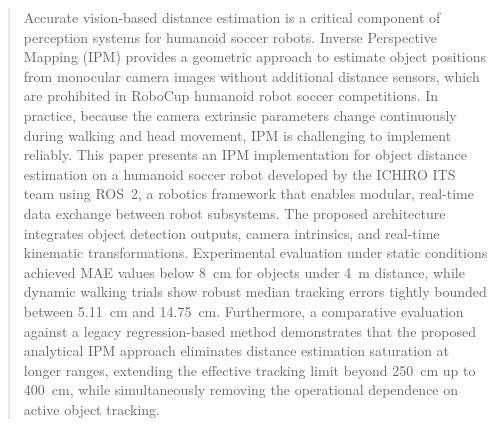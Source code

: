 \documentclass[journal]{IAENGtran}
\begin{document}







\maketitle

\pagestyle{empty}
\thispagestyle{empty}

\begin{abstract}
Accurate vision-based distance estimation is a critical component of
perception systems for humanoid soccer robots. Inverse Perspective Mapping
(IPM) provides a geometric approach to estimate object positions from
monocular camera images without additional distance sensors, which are prohibited
in RoboCup humanoid robot soccer competitions. In practice, because the camera extrinsic
parameters change continuously during walking and head movement, IPM is
challenging to implement reliably. This paper presents an IPM implementation
for object distance estimation on a humanoid soccer robot developed by the
ICHIRO ITS team using ROS~2, a robotics framework that enables modular, real-time
data exchange between robot subsystems. The proposed architecture integrates
object detection outputs, camera intrinsics, and real-time kinematic transformations.
Experimental evaluation under static conditions achieved MAE values below 8~cm
for objects under 4~m distance, while dynamic walking trials
show robust median tracking errors tightly bounded between 5.11~cm and 14.75~cm.
Furthermore, a comparative evaluation against a legacy regression-based method demonstrates 
that the proposed analytical IPM approach eliminates distance estimation saturation at 
longer ranges, extending the effective tracking limit beyond 250~cm up to 400~cm, while 
simultaneously removing the operational dependence on active object tracking.
\end{abstract}

\end{document}

